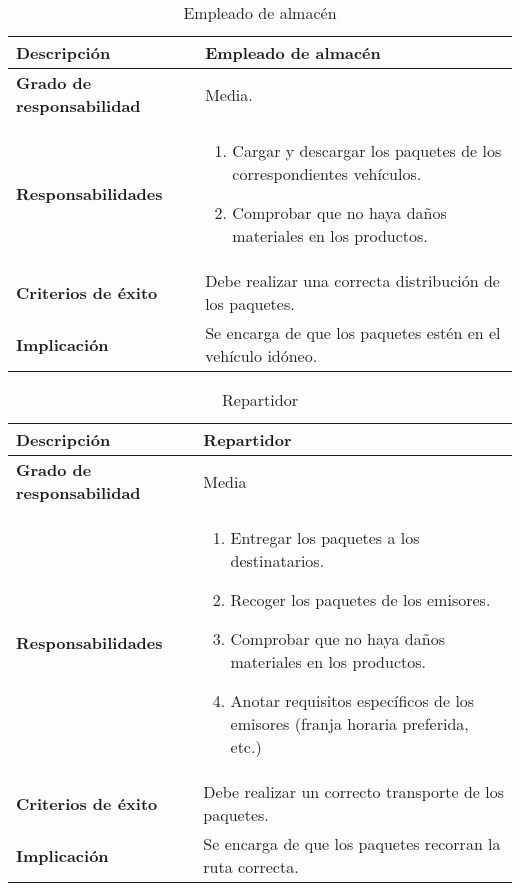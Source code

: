 \documentclass[12pt,spanish]{article}
\begin{document}

\begin{table}[H]
\begin{center}
\begin{tabular}{|l|p{10cm}|}
\hline
\textbf{Descripción} & Empleado de almacén \\
\hline
\textbf{Grado de responsabilidad} & Media. \\
\hline
\textbf{Responsabilidades} & 
\begin{minipage}{10cm}
    \vskip 1pt
    \begin{enumerate}
   		\item Cargar y descargar los paquetes de los correspondientes vehículos.
   		\item Comprobar que no haya daños materiales en los productos.
   \end{enumerate}
   \vskip 1pt
 \end{minipage}\\ 
\hline
\textbf{Criterios de éxito} & Debe realizar una correcta distribución de los paquetes.\\
\hline
\textbf{Implicación} & Se encarga de que los paquetes estén en el vehículo idóneo. \\
\hline
\end{tabular}
\caption{Empleado de almacén}
\end{center}
\end{table}

\begin{table}[H]
\begin{center}
\begin{tabular}{|l|m{10cm}|}
\hline
\textbf{Descripción} & Repartidor \\
\hline
\textbf{Grado de responsabilidad} & Media \\
\hline
\textbf{Responsabilidades} & 
\begin{minipage}{10cm}
    \vskip 1pt
    \begin{enumerate}
   		\item Entregar los paquetes a los destinatarios.
   		\item Recoger los paquetes de los emisores.
   		\item Comprobar que no haya daños materiales en los productos.
   		\item Anotar requisitos específicos de los emisores (franja horaria preferida, etc.)
   \end{enumerate}
   \vskip 1pt
 \end{minipage}\\ 
\hline
\textbf{Criterios de éxito} & Debe realizar un correcto transporte de los paquetes.\\
\hline
\textbf{Implicación} & Se encarga de que los paquetes recorran la ruta correcta. \\
\hline
\end{tabular}
\caption{Repartidor}
\end{center}
\end{table}
\end{document}

